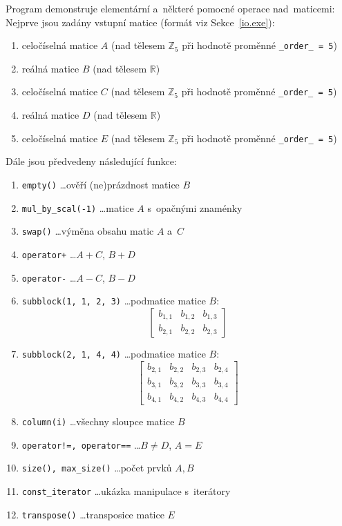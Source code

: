 \documentclass[11pt,a4paper]{article}
\theoremstyle{remark}
\begin{document}
Program demonstruje elementární a~některé pomocné operace nad~maticemi:
Nejprve jsou zadány vstupní matice (formát viz Sekce~\ref{io.exe}\thinspace):
\begin{enumerate}
\item celočíselná matice $A$ (nad tělesem $\mathbb{Z}_5$ při hodnotě proměnné
  \verb~_order_ = 5~)
\item reálná matice $B$ (nad tělesem $\mathbb{R}$)
\item celočíselná matice $C$ (nad tělesem $\mathbb{Z}_5$ při hodnotě proměnné
  \verb~_order_ = 5~)
\item reálná matice $D$ (nad tělesem $\mathbb{R}$)
\item celočíselná matice $E$ (nad tělesem $\mathbb{Z}_5$ při hodnotě proměnné
  \verb~_order_ = 5~)
\end{enumerate}
Dále jsou předvedeny následující funkce:
\begin{enumerate}
\item \verb~empty()~ \ldots ověří (ne)prázdnost matice $B$
\item \verb~mul_by_scal(-1)~ \ldots matice $A$ s~opačnými znaménky
\item \verb~swap()~ \ldots výměna obsahu matic $A$ a~$C$
\item \verb~operator+~ \ldots $A+C$, $B+D$
\item \verb~operator-~ \ldots $A-C$, $B-D$
\item \verb~subblock(1, 1, 2, 3)~ \ldots podmatice matice $B$:
\[
  \begin{bmatrix}
    b_{1,1} & b_{1,2} & b_{1,3} \\
    b_{2,1} & b_{2,2} & b_{2,3}
  \end{bmatrix}
\]
\item \verb~subblock(2, 1, 4, 4)~ \ldots podmatice matice $B$:
\[
  \begin{bmatrix}
    b_{2,1} & b_{2,2} & b_{2,3} & b_{2,4} \\
    b_{3,1} & b_{3,2} & b_{3,3} & b_{3,4} \\
    b_{4,1} & b_{4,2} & b_{4,3} & b_{4,4}
  \end{bmatrix}
\]
\item \verb~column(i)~ \ldots všechny sloupce matice $B$
\item \verb~operator!=, operator==~ \ldots $B \ne D$, $A = E$
\item \verb~size(), max_size()~ \ldots počet prvků $A, B$
\item \verb~const_iterator~ \ldots ukázka manipulace s~iterátory
\item \verb~transpose()~ \ldots transposice matice $E$
\end{enumerate}
\end{document}
